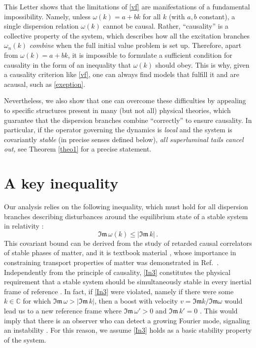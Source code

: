 \documentclass[prl, amsfonts, amssymb, amsmath, nofootinbib,reprint, showkeys, twoside,notitlepage]{revtex4-2}
\theoremstyle{definition}
\theoremstyle{theorem}
\theoremstyle{corollary}
\begin{document}
This Letter shows that the limitations of \eqref{vf} are manifestations of a fundamental impossibility. Namely, unless $\omega(k)=a+bk$ for all $k$ (with $a,b$ constant), a single dispersion relation $\omega(k)$ cannot be causal. Rather, ``causality'' is a collective property of the system, which describes how all the excitation branches $\omega_n(k)$ \textit{combine} when the full initial value problem is set up. Therefore, apart from $\omega(k)=a{+}bk$, it is impossible to formulate a sufficient condition for causality in the form of an inequality that $\omega(k)$ should obey. This is why, given a causality criterion like \eqref{vf}, one can always find models that fulfill it and are acausal, such as  \eqref{exeption}. 

Nevertheless, we also show that one can overcome these difficulties by appealing to specific structures present in many (but not all) physical theories, which guarantee that the dispersion branches combine ``correctly'' to ensure causality. In particular, if the operator governing the dynamics is \emph{local} and the system is covariantly \emph{stable} (in precise senses defined below), \emph{all superluminal tails cancel out,} see Theorem \ref{theo1} for a precise statement.

\section{A key inequality}
Our analysis relies on the following inequality, which must hold for all dispersion branches describing disturbances around the equilibrium state of a stable system in relativity \cite{HellerBounds2022,GavassinoBounds2023}:
\begin{equation}\label{In3}
\mathfrak{Im} \, \omega(k) \leq |\mathfrak{Im} \, k| \, .
\end{equation}
This covariant bound can be derived from the study of retarded causal correlators of stable phases of matter, and it is textbook material \cite{Itzykson:1980rh}, whose importance in constraining transport properties of matter was demonstrated in Ref.\ \cite{HellerBounds2022}. Independently from the principle of causality, \eqref{In3} constitutes the physical requirement that a stable system should be simultaneously stable in every inertial frame of reference \cite{GavassinoSuperluminal2021}. In fact, if \eqref{In3} were violated, namely if there were some $k \in \mathbb{C}$ for which $\mathfrak{Im}\, \omega > |\mathfrak{Im} \, k|$, then a boost with velocity $v=\mathfrak{Im} k/\mathfrak{Im} \omega$ would lead us to a new reference frame where $ \mathfrak{Im} \, \omega' >0 $ and $\mathfrak{Im} \, k' =0$ \cite{GavassinoBounds2023}.
This would imply that there is an observer who can detect a growing Fourier mode, signaling an instability \cite{Hiscock_Insatibility_first_order,Kost2000,GavassinoLyapunov_2020}. For this reason, we assume \eqref{In3} holds as a basic stability property of the system. 
\end{document}
